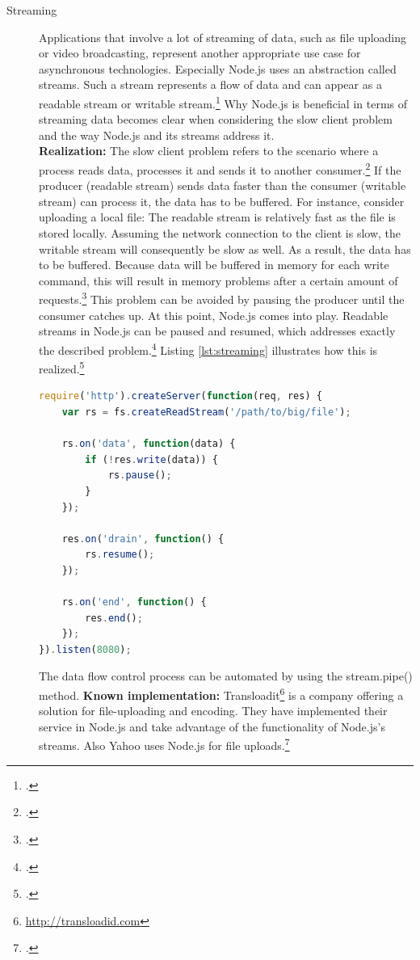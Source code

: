 \begin{description}
   \item[Streaming] Applications that involve a lot of streaming of data, such
   as file uploading or video broadcasting, represent another appropriate use
   case for asynchronous technologies. Especially Node.js uses an abstraction
   called streams. Such a stream represents a flow of data and can appear as a
   readable stream or writable stream.\footcite[Cf.][75]{teixeira_2012} Why
   Node.js is beneficial in terms of streaming data becomes clear when
   considering the slow client problem and the way Node.js and its streams
   address it.\\
  \textbf{Realization:} The slow client problem refers to the scenario where a
  process reads data, processes it and sends it to another consumer.\footcite[Cf.][80]{teixeira_2012}
  If the producer (readable stream) sends data faster than the consumer (writable stream)
  can process it, the data has to be buffered. For instance, consider uploading
  a local file: The readable stream is relatively fast as the file is stored locally.
  Assuming the network connection to the client is slow, the writable stream will consequently
  be slow as well. As a result, the data has to be buffered. Because data will be buffered in
  memory for each write command, this will result in memory problems after a certain amount of
  requests.\footcite[Cf.][81]{teixeira_2012} This problem can be avoided by pausing the producer 
  until the consumer catches up. At this point, Node.js comes into play. Readable streams 
  in Node.js can be paused and resumed, which addresses exactly the described 
  problem.\footcite[Cf.][81]{teixeira_2012} Listing \ref{lst:streaming} illustrates 
  how this is realized.\footcite[Cf.][81]{teixeira_2012}
  \item[]

\begin{lstlisting}[language=javascript,caption={Controlling streams},label=lst:streaming]
require('http').createServer(function(req, res) {
	var rs = fs.createReadStream('/path/to/big/file');
	
	rs.on('data', function(data) {
		if (!res.write(data)) {
			rs.pause();
		}
	});

	res.on('drain', function() {
		rs.resume();
	});

	rs.on('end', function() {
		res.end();
	});
}).listen(8080);
\end{lstlisting}


The data flow control process can be automated by using the stream.pipe() method. 
  \textbf{Known implementation:} Transloadit\footnote{\url{http://transloadid.com}} is a company offering a solution for file-uploading and encoding. They have implemented their service in Node.js and take advantage of the functionality of Node.js’s streams. Also Yahoo uses Node.js for file uploads.\footcite[Cf.][]{Odell_2012} 


\end{description}
